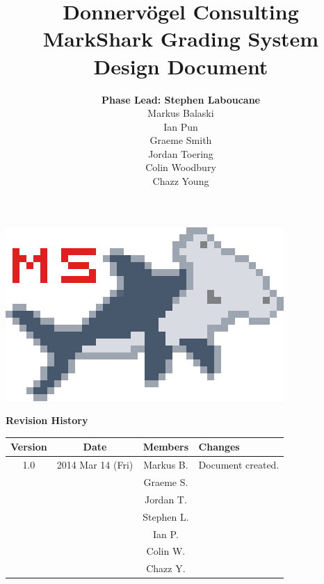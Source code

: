 \documentclass{article}
\begin{document}
\title{Donnervögel Consulting \\ MarkShark Grading System \\ Design Document}
\author{\textbf{Phase Lead: Stephen Laboucane} \\ Markus Balaski \\ Ian Pun \\
  Graeme Smith \\ Jordan Toering \\  Colin Woodbury \\ Chazz Young}
\maketitle
\centerline{\includegraphics{../images/logo/markshark-10x}}
\clearpage

\textbf{Revision History}
\begin{center}
  \begin{tabular}{| c | c | c | l |}
    \hline
    Version & Date & Members & Changes\\
    \hline
    1.0 & 2014 Mar 14 (Fri) & Markus B. & Document created.\\
    & & Graeme S. & \\
    & & Jordan T. & \\
    & & Stephen L. & \\
    & & Ian P. & \\
    & & Colin W. & \\
    & & Chazz Y. & \\
    \hline
  \end{tabular}
\end{center}
\clearpage

\tableofcontents
\clearpage
\end{document}
